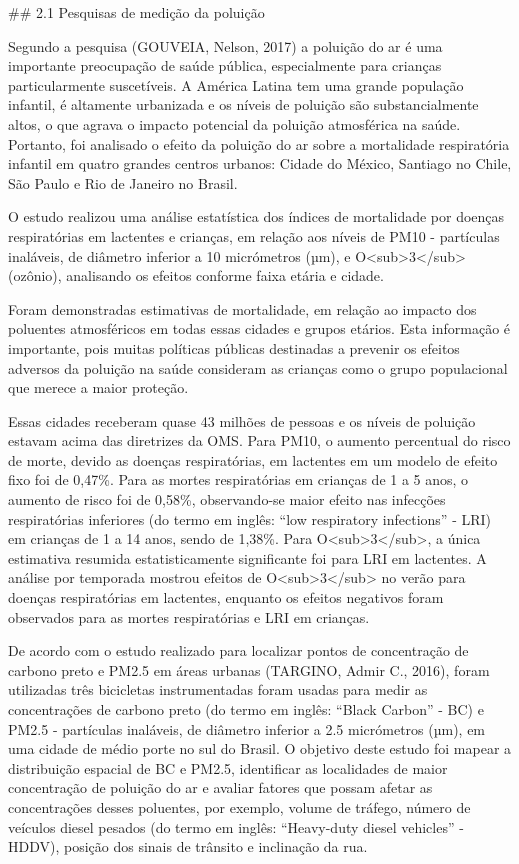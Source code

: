 
## 2.1 Pesquisas de medição da poluição

Segundo a pesquisa (GOUVEIA, Nelson, 2017) a poluição do ar é uma importante preocupação de saúde 
pública, especialmente para crianças particularmente suscetíveis. A América Latina tem uma grande 
população infantil, é altamente urbanizada e os níveis de poluição são substancialmente altos, o que 
agrava o impacto potencial da poluição atmosférica na saúde. Portanto, foi analisado o efeito da 
poluição do ar sobre a mortalidade respiratória infantil em quatro grandes centros urbanos: Cidade 
do México, Santiago no Chile, São Paulo e Rio de Janeiro no Brasil.

O estudo realizou uma análise estatística dos índices de mortalidade por doenças respiratórias em 
lactentes e crianças, em relação aos níveis de PM10 - partículas inaláveis, de diâmetro inferior a 
10 micrómetros (µm), e O<sub>3</sub> (ozônio), analisando os efeitos conforme faixa etária e cidade. 

Foram demonstradas estimativas de mortalidade, em relação ao impacto dos poluentes atmosféricos em 
todas essas cidades e grupos etários. Esta informação é importante, pois muitas políticas públicas 
destinadas a prevenir os efeitos adversos da poluição na saúde consideram as crianças como o grupo 
populacional que merece a maior proteção.

Essas cidades receberam quase 43 milhões de pessoas e os níveis de poluição estavam acima das 
diretrizes da OMS. Para PM10, o aumento percentual do risco de morte, devido as doenças 
respiratórias, em lactentes em um modelo de efeito fixo foi de 0,47\%. Para as mortes respiratórias 
em crianças de 1 a 5 anos, o aumento de risco foi de 0,58\%, observando-se maior efeito nas 
infecções respiratórias inferiores (do termo em inglês: “low respiratory infections” - LRI) em 
crianças de 1 a 14 anos, sendo de 1,38\%. Para O<sub>3</sub>, a única estimativa resumida 
estatisticamente significante foi para LRI em lactentes. A análise por temporada mostrou efeitos de 
O<sub>3</sub> no verão para doenças respiratórias em lactentes, enquanto os efeitos negativos foram 
observados para as mortes respiratórias e LRI em crianças.

De acordo com o estudo realizado para localizar pontos de concentração de carbono preto e PM2.5 em 
áreas urbanas (TARGINO, Admir C., 2016), foram utilizadas três bicicletas instrumentadas foram 
usadas para medir as concentrações de carbono preto (do termo em inglês: “Black Carbon” - BC) e 
PM2.5 - partículas inaláveis, de diâmetro inferior a 2.5 micrómetros (µm), em uma cidade de médio 
porte no sul do Brasil. O objetivo deste estudo foi mapear a distribuição espacial de BC e PM2.5, 
identificar as localidades de maior concentração de poluição do ar e avaliar fatores que possam 
afetar as concentrações desses poluentes, por exemplo, volume de tráfego, número de veículos diesel 
pesados (do termo em inglês: “Heavy-duty diesel vehicles” - HDDV), posição dos sinais de trânsito e 
inclinação da rua. 

